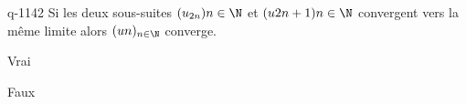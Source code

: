 \begin{truefalse}{q-1142}
Si les deux sous-suites $(u_{2n}){n\in\N}$ et $(u{2n+1}){n\in\N}$ convergent vers la même limite alors $(u{n})_{n\in\N}$ converge.
\item* Vrai
\item Faux
\end{truefalse}

